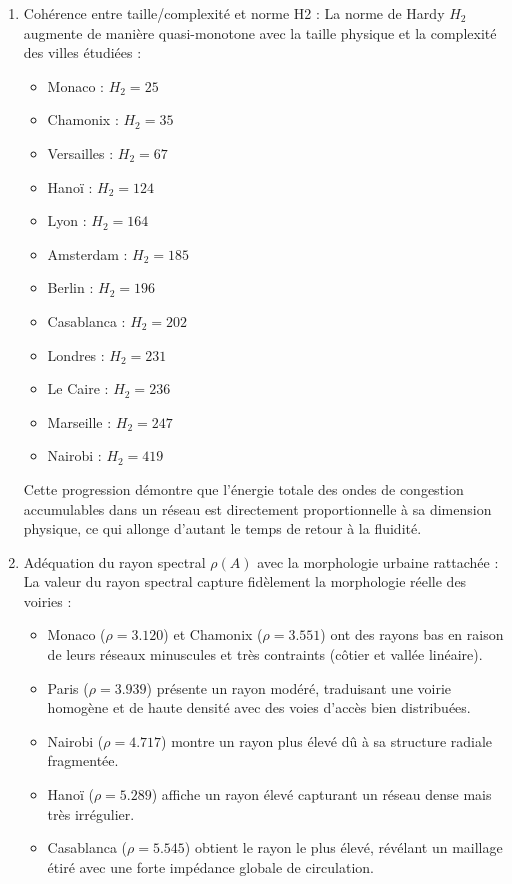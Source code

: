 \documentclass[10pt, a4paper]{article}
\providecommand{\tightlist}{}
\begin{document}
\begin{enumerate}
  Plus la non-normalité augmente, plus la constante de Kreiss augmente.
  C'est précisément ce que prédit la théorie des matrices non-normales :
  une forte asymétrie engendre des pseudospectres étendus dans le plan
  complexe, ce qui accroît le supremum de la résolvante et se traduit
  par une constante de Kreiss élevée.
\item
  Cohérence entre taille/complexité et norme H2 : La norme de Hardy
  \(H_2\) augmente de manière quasi-monotone avec la taille physique et
  la complexité des villes étudiées :

  \begin{itemize}
  \tightlist
  \item
    Monaco : \(H_2 = 25\)
  \item
    Chamonix : \(H_2 = 35\)
  \item
    Versailles : \(H_2 = 67\)
  \item
    Hanoï : \(H_2 = 124\)
  \item
    Lyon : \(H_2 = 164\)
  \item
    Amsterdam : \(H_2 = 185\)
  \item
    Berlin : \(H_2 = 196\)
  \item
    Casablanca : \(H_2 = 202\)
  \item
    Londres : \(H_2 = 231\)
  \item
    Le Caire : \(H_2 = 236\)
  \item
    Marseille : \(H_2 = 247\)
  \item
    Nairobi : \(H_2 = 419\)
  \end{itemize}

  Cette progression démontre que l'énergie totale des ondes de
  congestion accumulables dans un réseau est directement proportionnelle
  à sa dimension physique, ce qui allonge d'autant le temps de retour à
  la fluidité.
\item
  Adéquation du rayon spectral \(\rho(A)\) avec la morphologie urbaine
  rattachée : La valeur du rayon spectral capture fidèlement la
  morphologie réelle des voiries :

  \begin{itemize}
  \tightlist
  \item
    Monaco (\(\rho = 3.120\)) et Chamonix (\(\rho = 3.551\)) ont des
    rayons bas en raison de leurs réseaux minuscules et très contraints
    (côtier et vallée linéaire).
  \item
    Paris (\(\rho = 3.939\)) présente un rayon modéré, traduisant une
    voirie homogène et de haute densité avec des voies d'accès bien
    distribuées.
  \item
    Nairobi (\(\rho = 4.717\)) montre un rayon plus élevé dû à sa
    structure radiale fragmentée.
  \item
    Hanoï (\(\rho = 5.289\)) affiche un rayon élevé capturant un réseau
    dense mais très irrégulier.
  \item
    Casablanca (\(\rho = 5.545\)) obtient le rayon le plus élevé,
    révélant un maillage étiré avec une forte impédance globale de
    circulation.
  \end{itemize}
\end{enumerate}
\end{document}
